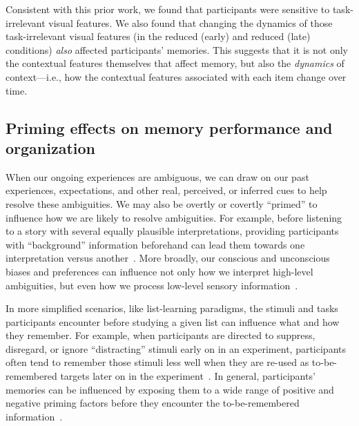 \documentclass[11pt]{article}
\begin{document}
Consistent with this prior work, we found that participants were sensitive to
task-irrelevant visual features. We also found that changing the dynamics of
those task-irrelevant visual features (in the reduced (early) and reduced
(late) conditions) \textit{also} affected participants' memories. This suggests
that it is not only the contextual features themselves that affect memory, but
also the \textit{dynamics} of context---i.e., how the contextual features
associated with each item change over time.

\subsection*{Priming effects on memory performance and organization}


When our ongoing experiences are ambiguous, we can draw on our past
experiences, expectations, and other real, perceived, or inferred cues to help
resolve these ambiguities. We may also be overtly or covertly ``primed'' to
influence how we are likely to resolve ambiguities. For example, before
listening to a story with several equally plausible interpretations, providing
participants with ``background'' information beforehand can lead them towards
one interpretation versus another~\citep{YeshEtal17}. More broadly, our
conscious and unconscious biases and preferences can influence not only how we
interpret high-level ambiguities, but even how we process low-level sensory
information~\citep{KataEtal23}.

In more simplified scenarios, like list-learning paradigms, the stimuli and
tasks participants encounter before studying a given list can influence what
and how they remember. For example, when participants are directed to suppress,
disregard, or ignore ``distracting'' stimuli early on in an experiment,
participants often tend to remember those stimuli less well when they are
re-used as to-be-remembered targets later on in the experiment~\citep{Tipp85}.
In general, participants' memories can be influenced by exposing them to a wide
range of positive and negative priming factors before they encounter the
to-be-remembered information~\citep{BaloEtal92, ClayChat89, Donn88, FlexTulv82,
GottEtal12, HuanEtal04, Hube08, HubeEtal01, McNa94, Neel77, Rabi86, TulvScha91,
WatkEtal92, WiggMart98}.
\end{document}
